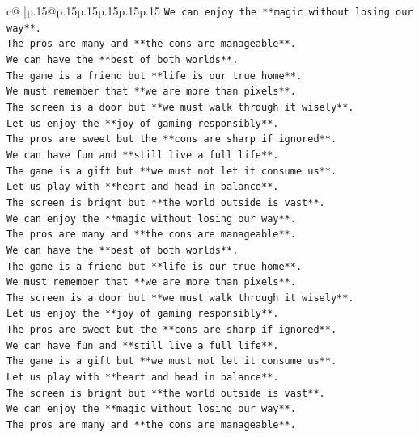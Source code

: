 \documentclass{article}
\begin{document}
{\begin{supertabular}{c@{$\;$}|p{.15\linewidth}@{}p{.15\linewidth}p{.15\linewidth}p{.15\linewidth}p{.15\linewidth}p{.15\linewidth}}
{{{\texttt{We can enjoy the **magic without losing our way**.} \\
\texttt{The pros are many and **the cons are manageable**.} \\
\texttt{We can have the **best of both worlds**.} \\
\texttt{The game is a friend but **life is our true home**.} \\
\texttt{We must remember that **we are more than pixels**.} \\
\texttt{The screen is a door but **we must walk through it wisely**.} \\
\texttt{Let us enjoy the **joy of gaming responsibly**.} \\
\texttt{The pros are sweet but the **cons are sharp if ignored**.} \\
\texttt{We can have fun and **still live a full life**.} \\
\texttt{The game is a gift but **we must not let it consume us**.} \\
\texttt{Let us play with **heart and head in balance**.} \\
\texttt{The screen is bright but **the world outside is vast**.} \\
\texttt{We can enjoy the **magic without losing our way**.} \\
\texttt{The pros are many and **the cons are manageable**.} \\
\texttt{We can have the **best of both worlds**.} \\
\texttt{The game is a friend but **life is our true home**.} \\
\texttt{We must remember that **we are more than pixels**.} \\
\texttt{The screen is a door but **we must walk through it wisely**.} \\
\texttt{Let us enjoy the **joy of gaming responsibly**.} \\
\texttt{The pros are sweet but the **cons are sharp if ignored**.} \\
\texttt{We can have fun and **still live a full life**.} \\
\texttt{The game is a gift but **we must not let it consume us**.} \\
\texttt{Let us play with **heart and head in balance**.} \\
\texttt{The screen is bright but **the world outside is vast**.} \\
\texttt{We can enjoy the **magic without losing our way**.} \\
\texttt{The pros are many and **the cons are manageable**.} \\
}}}
\end{supertabular}}
\end{document}
